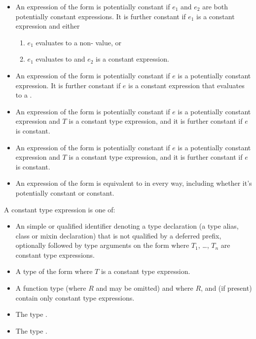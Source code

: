 \documentclass[makeidx]{article}
\begin{document}
\begin{itemize}
\item An expression of the form  is potentially constant if $e_1$ and $e_2$ are both potentially constant expressions. It is further constant if $e_1$ is a constant expression and either
\begin{enumerate}
\item $e_1$ evaluates to a non-\NULL{} value, or
\item $e_1$ evaluates to \NULL{} and $e_2$ is a constant expression.
\end{enumerate}

\item An expression of the form  is potentially constant if $e$ is a potentially constant expression. It is further constant if $e$ is a constant expression that evaluates to a .

\item An expression of the form  is potentially constant if $e$ is a potentially constant expression and $T$ is a constant type expression, and it is further constant if $e$ is constant.

\item An expression of the form  is potentially constant if $e$ is a potentially constant expression and $T$ is a constant type expression, and it is further constant if $e$ is constant.

\item{}
An expression of the form  is equivalent to  in every way,
including whether it's potentially constant or constant.

\end{itemize}

\LMHash{}%
A constant type expression is one of:
\begin{itemize}
\item An simple or qualified identifier denoting a type declaration (a type alias, class or mixin declaration) that is not qualified by a deferred prefix,
optionally followed by type arguments on the form
where $T_1$, \ldots{}, $T_n$ are constant type expressions.
\item A type of the form  where $T$ is a constant type expression.
\item A function type
(where $R$ and  may be omitted)
and where $R$,  and  (if present) contain only constant type expressions.
\item The type \VOID{}.
\item The type \DYNAMIC{}.
\end{itemize}
\end{document}
